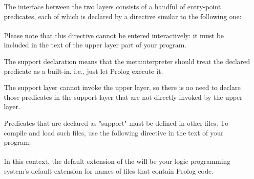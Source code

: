 The interface between the two layers consists of a handful of entry-point
predicates, each of which is  declared by a directive similar to the
following one:\\
\ind{}\\
Please note that this directive cannot be entered interactively: it must be
included in the text of the upper layer part of your program.

The support declaration means that the metainterpreter should treat the
declared predicate as a built-in, i.e., just let Prolog execute it.

The support layer cannot invoke the upper layer, so there is no need to
declare those predicates in the support layer that are not directly invoked
by the upper layer.

Predicates that are declared as "support" must be defined in other files.  To
compile and load such files, use the following directive in the text of your
program:\\
\ind{}\\

In this context, the default extension of the  will be your
logic programming system's default extension for names of files that contain
Prolog code.%
%
%




